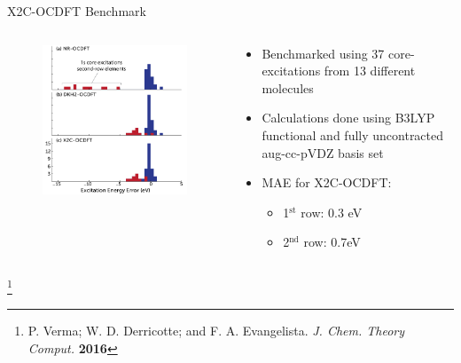 \documentclass[t]{beamer}
\newcommand\blfootnote[1]{%
  \begingroup
  \renewcommand\thefootnote{}\footnote{#1}%
  \addtocounter{footnote}{-1}%
  \endgroup
}
\begin{document}
\begin{frame}{X2C-OCDFT Benchmark}
\begin{columns}
\begin{column}{0.5\textwidth}
\begin{figure}
\centering
\includegraphics[width=\linewidth]{figure_3.pdf}
\end{figure}
\end{column}
\begin{column}{0.5\textwidth}
\begin{itemize}
\item Benchmarked using 37 core-excitations from 13 different molecules
\item Calculations done using B3LYP functional and fully uncontracted aug-cc-pVDZ basis set
\item MAE for X2C-OCDFT:
		\begin{itemize}
		\item 1$^{\text{st}}$ row: 0.3 eV
		\item 2$^{\text{nd}}$ row: 0.7eV
		\end{itemize}
\end{itemize}
\end{column}
\end{columns}
\blfootnote{P. Verma; W. D. Derricotte; and F. A. Evangelista. \textit{J. Chem. Theory Comput.} \textbf{2016}}
\end{frame}
\end{document}
